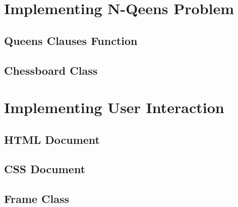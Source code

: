 \section{Implementing N-Qeens Problem}
\label{sec:impQueens}

\subsection{Queens Clauses Function}

\subsection{Chessboard Class}

\section{Implementing User Interaction}
\label{sec:impUI}

\subsection{HTML Document}

\subsection{CSS Document}

\subsection{Frame Class}